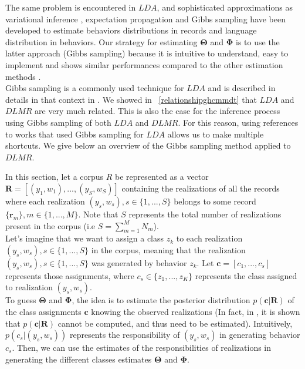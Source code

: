 The same problem is encountered in $LDA$, and sophisticated approximations as variational inference \cite{lda}, expectation propagation \cite{expprop} and Gibbs sampling \cite{gibbs} have been developed to estimate behaviors distributions in records and language distribution in behaviors. Our strategy for estimating  $\boldsymbol{\Theta }$ and $\boldsymbol{\Phi }$ is to use the latter approach (Gibbs sampling) because it is intuitive to understand, easy to implement and shows similar performances compared to the other estimation methods \cite{inferencecomp}.
\\Gibbs sampling \cite{gibbsdef} is a commonly used technique for $LDA$ and is described in details in that context in \cite{gibbs}. We showed in ~\ref{relationshipghcmmdt} that $LDA$ and $DLMR$ are very much related. This is also the case for the inference process using Gibbs sampling of both $LDA$ and $DLMR$. For this reason, using references to works that used Gibbs sampling for $LDA$ allows us to make multiple shortcuts. We give below an overview of the Gibbs sampling method applied to $DLMR$. \par

In this section, let a corpus $R$ be represented as a vector $\mathbf{R}=[(y_{1},w_{1}),...,(y_{S},w_{S})]$ containing the realizations of all the records where each realization $(y_{s},w_{s}), s\in \{1,...,S\}$ belongs to some record $\{\mathbf{r}_{m}\}, m\in \{1,...,M\}$. Note that $S$ represents the total number of realizations present in the corpus (i.e $S=\sum_{m=1}^{M}N_{m}$).
\\Let's imagine that we want to assign a class $z_{k}$ to each realization $(y_{s},w_{s}), s\in \{1,...,S\}$ in the corpus, meaning that the realization $(y_{s},w_{s}), s\in \{1,...,S\}$ was generated by behavior $z_{k}$. Let $\mathbf{c}=[c_{1},...,c_{s}]$ represents those assignments, where $c_{s}\in \{z_{1},...,z_{K}\}$ represents the class assigned to realization $(y_{s},w_{s})$.
\\To guess $\boldsymbol{\Theta }$ and $\boldsymbol{\Phi }$, the idea is to estimate the  posterior distribution $p(\mathbf{c}|\mathbf{R})$ of the class assignments $\mathbf{c}$ knowing the observed realizations (In fact, in \cite{gibbs}, it is shown that $p(\mathbf{c}|\mathbf{R})$ cannot be computed, and thus need to be estimated). Intuitively, $p(c_{s}|(y_{s},w_{s}))$ represents the responsibility of $(y_{s},w_{s})$ in generating behavior $c_{s}$. Then, we can use the estimates of the responsibilities of realizations in generating the different classes estimates $\boldsymbol{\Theta }$ and $\boldsymbol{\Phi }$. \par

